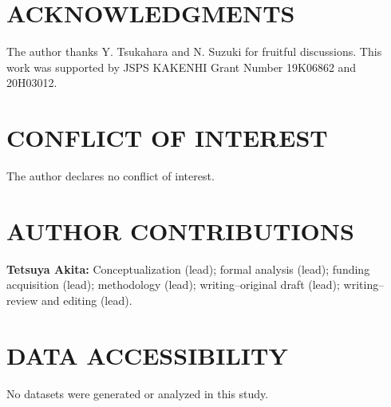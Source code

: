 \documentclass[12pt, English]{article}
\begin{document}
\begin{spacing}{1.9}
\begin{comment}
\end{comment}

\section*{ACKNOWLEDGMENTS}
The author thanks Y. Tsukahara and N. Suzuki for fruitful discussions. This work was supported by JSPS KAKENHI Grant Number 19K06862 and 20H03012.

\section*{CONFLICT OF INTEREST}
The author declares no conflict of interest.

\section*{AUTHOR CONTRIBUTIONS}
{\bf Tetsuya Akita:} Conceptualization (lead); formal analysis (lead); funding acquisition (lead); methodology (lead); writing--original draft (lead); writing--review and editing (lead).

\section*{DATA ACCESSIBILITY}
No datasets were generated or analyzed in this study.




\clearpage


\end{spacing}
\end{document}
